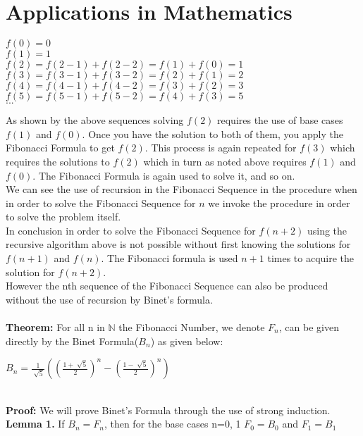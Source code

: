 \documentclass{article}
\begin{document}
\section{Applications in Mathematics}
\begin{center}
$f(0)=0$
\\
$f(1)=1$
\\
$f(2)=f(2-1)+f(2-2)=f(1)+f(0)=1$
\\
$f(3)=f(3-1)+f(3-2)=f(2)+f(1)=2$
\\
$f(4)=f(4-1)+f(4-2)=f(3)+f(2)=3$
\\
$f(5)=f(5-1)+f(5-2)=f(4)+f(3)=5$
\\
$...$
\\
\end{center}
As shown by the above sequences solving $f(2)$ requires the use of base cases $f(1)$ and $f(0)$.  Once you have the solution to both of them, you apply the Fibonacci Formula to get $f(2)$.  This process is again repeated for $f(3)$ which requires the solutions to $f(2)$ which in turn as noted above requires $f(1)$ and $f(0)$.  The Fibonacci Formula is again used to solve it, and so on.  
\\
We can see the use of recursion in the Fibonacci Sequence in the procedure when in order to solve the Fibonacci Sequence for $n$ we invoke the procedure in order to solve the problem itself.   
\\
In conclusion in order to solve the Fibonacci Sequence for $f(n+2)$ using the recursive algorithm above is not possible without first knowing the solutions for $f(n+1)$ and $f(n)$. The Fibonacci formula is used $n+1$ times to acquire the solution for $f(n+2)$.  
\\
However the nth sequence of the Fibonacci Sequence can also be produced without the use of recursion by Binet's formula.
\\
\\
{\bf Theorem:} For all n in $\mathbb{N}$ the Fibonacci Number, we denote $F_n$, can be given directly by the Binet Formula($B_n$) as given below:
\\
\begin{center}
	$B_n=\frac{1}{\sqrt[]{5}}((\frac{1+\sqrt[]{5}}{2})^n-(\frac{1-\sqrt[]{5}}{2})^n)$
\end{center}
~\\
{\bf Proof:} We will prove Binet's Formula through the use of strong induction.
\\
{\bf Lemma 1.} 
If $B_n=F_n$, then for the base cases n=0, 1 $F_0=B_0$ and $F_1=B_1$  
\\
\end{document}
